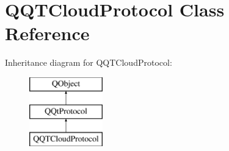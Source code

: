 \hypertarget{class_q_q_t_cloud_protocol}{}\section{Q\+Q\+T\+Cloud\+Protocol Class Reference}
\label{class_q_q_t_cloud_protocol}
Inheritance diagram for Q\+Q\+T\+Cloud\+Protocol\+:\begin{figure}[H]
\begin{center}
\leavevmode
\includegraphics[height=3.000000cm]{class_q_q_t_cloud_protocol}
\end{center}
\end{figure}
